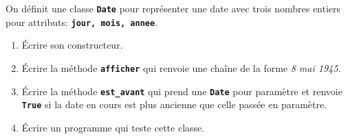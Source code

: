 \documentclass[a4paper,11pt]{article}
\begin{document}
\begin{exo}
    On définit une classe \textbf{\texttt{Date}} pour représenter une date avec trois nombres entiers pour attributs: \textbf{\texttt{jour, mois, annee}}.
    \begin{enumerate}
        \item Écrire son constructeur.
        \item Écrire la méthode \textbf{\texttt{afficher}} qui renvoie une chaîne de la forme \emph{8 mai 1945}.
        \item Écrire la méthode \textbf{\texttt{est\_avant}} qui prend une \textbf{\texttt{Date}} pour paramètre et renvoie \textbf{\texttt{True}} si la date en cours est plus ancienne que celle passée en paramètre.
        \item Écrire un programme qui teste cette classe.
    \end{enumerate}
\end{exo}
\end{document}
